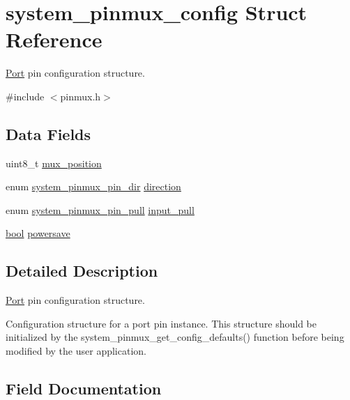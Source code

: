 \hypertarget{structsystem__pinmux__config}{}\section{system\+\_\+pinmux\+\_\+config Struct Reference}
\label{structsystem__pinmux__config}


\mbox{\hyperlink{struct_port}{Port}} pin configuration structure.  




{\ttfamily \#include $<$pinmux.\+h$>$}

\subsection*{Data Fields}
\begin{DoxyCompactItemize}
\item 
uint8\+\_\+t \mbox{\hyperlink{structsystem__pinmux__config_aa9646c2ccc3560b908c071d79f304ef1}{mux\+\_\+position}}
\item 
enum \mbox{\hyperlink{group__asfdoc__sam0__system__pinmux__group_gaef5ed797ec6ce6e7f2ca4bafd3f77df2}{system\+\_\+pinmux\+\_\+pin\+\_\+dir}} \mbox{\hyperlink{structsystem__pinmux__config_a5bee5567732c5d49ccdc5b289c7153c0}{direction}}
\item 
enum \mbox{\hyperlink{group__asfdoc__sam0__system__pinmux__group_ga936e823e4b08dc981d39c273182eb1c6}{system\+\_\+pinmux\+\_\+pin\+\_\+pull}} \mbox{\hyperlink{structsystem__pinmux__config_a0cd4d1807014bbdb629546ddd3a087e5}{input\+\_\+pull}}
\item 
\mbox{\hyperlink{group__group__sam0__utils_ga97a80ca1602ebf2303258971a2c938e2}{bool}} \mbox{\hyperlink{structsystem__pinmux__config_afbc3e052896051a278a5ad17f6a6e2bb}{powersave}}
\end{DoxyCompactItemize}


\subsection{Detailed Description}
\mbox{\hyperlink{struct_port}{Port}} pin configuration structure. 

Configuration structure for a port pin instance. This structure should be initialized by the system\+\_\+pinmux\+\_\+get\+\_\+config\+\_\+defaults() function before being modified by the user application. 

\subsection{Field Documentation}
\mbox{\label{structsystem__pinmux__config_a5bee5567732c5d49ccdc5b289c7153c0}} 
